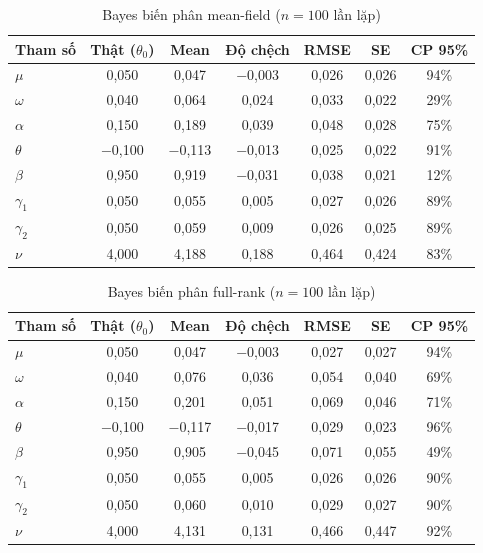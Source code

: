 \documentclass[11pt,a4paper]{article}
\begin{document}
\begin{table}[H]\centering\footnotesize
\caption{Bayes biến phân mean-field ($n=100$ lần lặp)}
\begin{tabularx}{\textwidth}{l C C C C C C}
\toprule
\textbf{Tham số} & \textbf{Thật ($\theta_0$)} & \textbf{Mean} & \textbf{Độ chệch} & \textbf{RMSE} & \textbf{SE} & \textbf{CP 95\%} \\
\midrule
$\mu$ & 0,050 & 0,047 & $-$0,003 & 0,026 & 0,026 & 94\% \\
$\omega$ & 0,040 & 0,064 & 0,024 & 0,033 & 0,022 & 29\% \\
$\alpha$ & 0,150 & 0,189 & 0,039 & 0,048 & 0,028 & 75\% \\
$\theta$ & $-$0,100 & $-$0,113 & $-$0,013 & 0,025 & 0,022 & 91\% \\
$\beta$ & 0,950 & 0,919 & $-$0,031 & 0,038 & 0,021 & 12\% \\
$\gamma_1$ & 0,050 & 0,055 & 0,005 & 0,027 & 0,026 & 89\% \\
$\gamma_2$ & 0,050 & 0,059 & 0,009 & 0,026 & 0,025 & 89\% \\
$\nu$ & 4,000 & 4,188 & 0,188 & 0,464 & 0,424 & 83\% \\
\bottomrule
\end{tabularx}
\end{table}

\begin{table}[H]\centering\footnotesize
\caption{Bayes biến phân full-rank ($n=100$ lần lặp)}
\begin{tabularx}{\textwidth}{l C C C C C C}
\toprule
\textbf{Tham số} & \textbf{Thật ($\theta_0$)} & \textbf{Mean} & \textbf{Độ chệch} & \textbf{RMSE} & \textbf{SE} & \textbf{CP 95\%} \\
\midrule
$\mu$ & 0,050 & 0,047 & $-$0,003 & 0,027 & 0,027 & 94\% \\
$\omega$ & 0,040 & 0,076 & 0,036 & 0,054 & 0,040 & 69\% \\
$\alpha$ & 0,150 & 0,201 & 0,051 & 0,069 & 0,046 & 71\% \\
$\theta$ & $-$0,100 & $-$0,117 & $-$0,017 & 0,029 & 0,023 & 96\% \\
$\beta$ & 0,950 & 0,905 & $-$0,045 & 0,071 & 0,055 & 49\% \\
$\gamma_1$ & 0,050 & 0,055 & 0,005 & 0,026 & 0,026 & 90\% \\
$\gamma_2$ & 0,050 & 0,060 & 0,010 & 0,029 & 0,027 & 90\% \\
$\nu$ & 4,000 & 4,131 & 0,131 & 0,466 & 0,447 & 92\% \\
\bottomrule
\end{tabularx}
\end{table}
\end{document}
